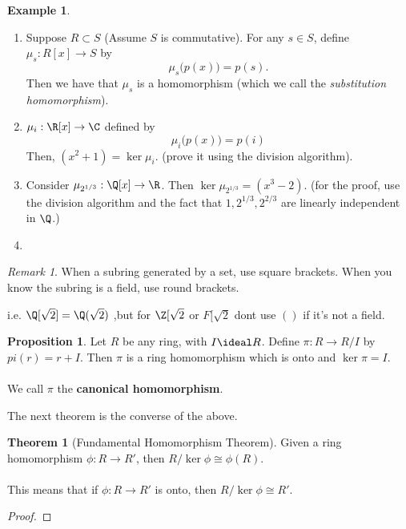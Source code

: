 \documentclass[a5paper]{article}
\theoremstyle{definition}%
\newtheorem*{theorem*}{Theorem} %
\newtheorem*{proposition*}{Proposition}
\newtheorem*{example*}{Example}
\numberwithin{exercise}{section}
\theoremstyle{remark}%
\newtheorem*{remark*}{Remark}
\begin{document}
\begin{example*}\mbox{}
\begin{enumerate}
\item \begin{highlight}
Suppose $R\subset S$ (Assume $S$ is commutative). For any $s\in S$, define $\mu_s:R[x]\to S$ by 
$$\mu_s\big(p(x)\big)=p(s).$$
Then we have that $\mu_s$ is a homomorphism (which we call the \emph{substitution homomorphism}). 
\end{highlight}

\item $\mu_i:\R[x]\to\C$ defined by 
$$\mu_i\big(p(x)\big) = p(i)$$
Then, $(x^2+1)=\ker\mu_i$. (prove it using the division algorithm). 

\item Consider $\mu_{2^{1/3}}:\Q[x]\to \R$. Then $\ker\mu_{2^{1/3}}=(x^3-2)$. (for the proof, use the division algorithm and the fact that $1, 2^{1/3}, 2^{2/3}$ are linearly independent in $\Q$.)

\item \mbox{}

\end{enumerate}
\end{example*}

\begin{remark*}
When a subring generated by a set, use square brackets. When you know the subring is a field, use round brackets. 

i.e. $\Q[\sqrt{2}]=\Q(\sqrt{2})$ ,but for $\Z[\sqrt{2}$ or $F[\sqrt{2}$ dont use $()$ if it's not a field. 
\end{remark*}

\begin{highlight}
\begin{proposition*}
Let $R$ be any ring, with $I\ideal R$. Define $\pi:R \to R/I$  by $pi(r)=r+I$. Then $\pi$ is a ring homomorphism which is onto and $\ker\pi=I$. \\
\\
We call $\pi$ the \textbf{canonical homomorphism}. 
\end{proposition*}
\end{highlight}

The next theorem is the converse of the above. 

\begin{highlight}
\begin{theorem*}[Fundamental Homomorphism Theorem]
Given a ring homomorphism $\phi:R\to R'$, then $R/\ker \phi \cong \phi(R)$. \\
\\
This means that if $\phi:R\to R'$ is onto, then $R/\ker \phi \cong R'$.
\end{theorem*}
\end{highlight}
\begin{proof}\mbox{}
\end{proof}
\end{document}

